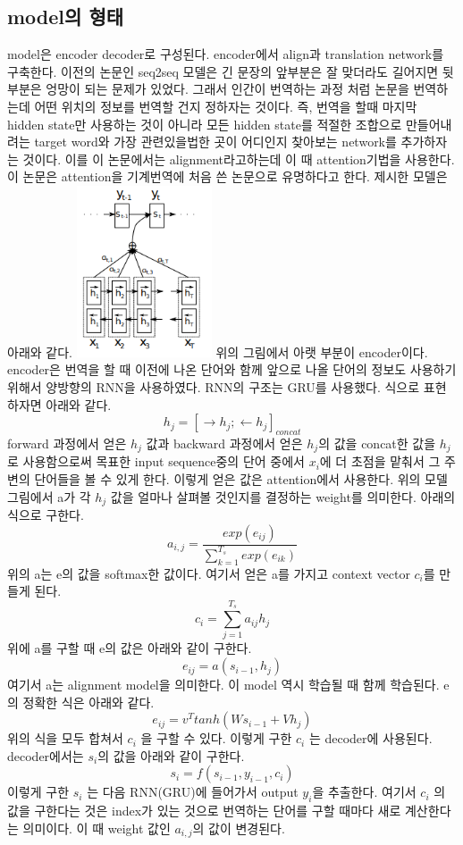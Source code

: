\documentclass[extendedabs]{bmvc2k}
\begin{document}
 \subsection{model의 형태\cite{youtube_attention}}
 \quad model은 encoder decoder로 구성된다. encoder에서 align과 translation network를 구축한다. 
 이전의 논문인 seq2seq 모델은 긴 문장의 앞부분은 잘 맞더라도 길어지면 뒷부분은 엉망이 되는 문제가 있었다. 그래서 인간이 번역하는 과정 처럼 논문을 번역하는데 어떤 위치의 정보를 번역할 건지 정하자는 것이다.
 즉, 번역을 할때 마지막 hidden state만 사용하는 것이 아니라 모든 hidden state를 적절한 조합으로 만들어내려는 target word와 가장 관련있을법한 곳이 어디인지 찾아보는 network를 추가하자는 것이다.
 이를 이 논문에서는 alignment라고하는데 이 때 attention기법을 사용한다. 이 논문은 attention을 기계번역에 처음 쓴 논문으로 유명하다고 한다.
 제시한 모델은 아래와 같다.
 \newline  \includegraphics[width=4cm]{images/02_attention.PNG}
 \newline 위의 그림에서 아랫 부분이 encoder이다. encoder은 번역을 할 때 이전에 나온 단어와 함께 앞으로 나올 단어의 정보도 사용하기 위해서 양방향의 RNN을 사용하였다.
 RNN의 구조는 GRU를 사용했다. 식으로 표현하자면 아래와 같다. 
 $$h_j = [ \rightarrow h_j ; \leftarrow h_j]_{concat}$$
 forward 과정에서 얻은 $h_j$ 값과 backward 과정에서 얻은 $h_j$의 값을 concat한 값을 $h_j$로 사용함으로써 목표한 input sequence중의 단어 중에서 $x_i$에 더 초점을 맡춰서 그 주변의 단어들을 볼 수 있게 한다.
 이렇게 얻은 값은 attention에서 사용한다. 위의 모델 그림에서 a가 각 $h_j$ 값을 얼마나 살펴볼 것인지를 결정하는 weight를 의미한다. 아래의 식으로 구한다.
 $$ a_{i,j} = \frac{exp(e_{ij})}{\sum_{k=1}^{T_s} exp(e_{ik})}$$
 위의 a는 e의 값을 softmax한 값이다. 여기서 얻은 a를 가지고 context vector $c_i$를 만들게 된다.
 $$ c_i = \sum_{j=1}^{T_s} a_{ij}h_j $$
 위에 a를 구할 때 e의 값은 아래와 같이 구한다.
 $$ e_{ij} = a(s_{i-1},h_j) $$
 여기서 a는 alignment model을 의미한다. 이 model 역시 학습될 때 함께 학습된다. e의 정확한 식은 아래와 같다.
 $$ e_{ij} = v^T tanh(Ws_{i-1} + V h_j) $$ 
 위의 식을 모두 합쳐서 $c_i$ 을 구할 수 있다. 이렇게 구한 $c_i$ 는 decoder에 사용된다. decoder에서는 $s_i$의 값을 아래와 같이 구한다.
 $$s_i = f(s_{i-1},y_{i-1},c_i)$$
 이렇게 구한 $s_i$ 는 다음 RNN(GRU)에 들어가서 output $y_i$을 추출한다. 여기서 $c_i$ 의 값을 구한다는 것은 index가 있는 것으로 번역하는 단어를 구할 때마다 
 새로 계산한다는 의미이다. 이 때 weight 값인 $a_{i,j}$의 값이 변경된다.
\end{document}
